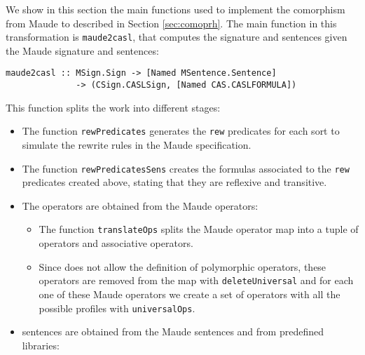
We show in this section the main functions used to implement the comorphism
from Maude to \CASL described in Section \ref{sec:comoprh}.
The main function in this transformation is
\verb"maude2casl", that computes the \CASL signature and sentences
given the Maude signature and sentences:

{\codesize
\begin{verbatim}
maude2casl :: MSign.Sign -> [Named MSentence.Sentence]
              -> (CSign.CASLSign, [Named CAS.CASLFORMULA])
\end{verbatim}
}

This function splits the work into different stages:

\begin{itemize}

\item
The function \verb"rewPredicates" generates the \verb"rew" predicates for
each sort to simulate the rewrite rules in the Maude specification.

\item
The function \verb"rewPredicatesSens" creates the formulas associated to
the \verb"rew" predicates created above, stating that they are reflexive
and transitive.

\item
The \CASL operators are obtained from the Maude operators:

\begin{itemize}
\item
The function \verb"translateOps" splits the Maude operator map
into a tuple of \CASL operators and \CASL associative operators.

\item
Since \CASL does not allow the definition
of polymorphic operators, these operators are removed from the map
with \verb"deleteUniversal" and for each one of these Maude operators we
create a set of \CASL operators with all the possible profiles with
\verb"universalOps".

\end{itemize}

\item \CASL sentences are obtained from the Maude sentences and from
predefined \CASL libraries:


\end{itemize}
